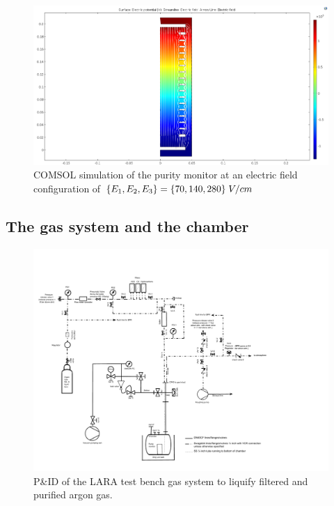 \documentclass[a4paper,11pt]{article}
\begin{document}
\begin{figure}
	\begin{center}
	\includegraphics[width=1\textwidth, trim={0 0cm 0cm 0cm}, clip=true]{figures/ComsolForPaper.png}			
	\caption{COMSOL simulation of the purity monitor at an electric field configuration of $\protect \{E_1, E_2, E_3\} = \{70, 140, 280\}\;V/cm$ }
	\label{fig:Comsol}
	\end{center}
\end{figure}

\subsection{The gas system and the chamber}
\begin{figure}
	\begin{center}
	\includegraphics[width=1\textwidth, trim={0 1cm 6cm 2cm}, clip=true]{figures/PnID.pdf}			
	\caption{P\&ID of the LARA test bench gas system to liquify filtered and purified argon gas.}
	\label{fig:PnID}
	\end{center}
\end{figure}
\end{document}
